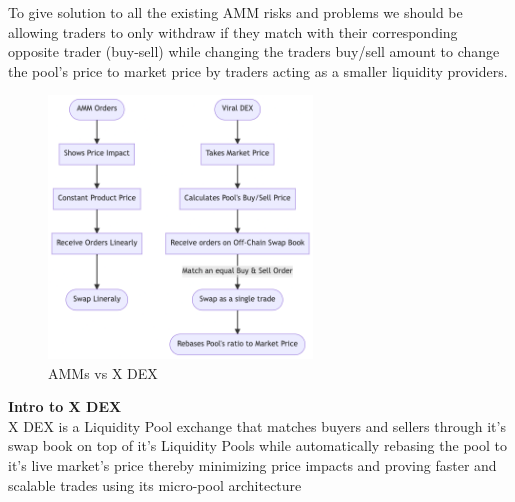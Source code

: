 \documentclass[letterpaper,11pt]{article}
\begin{document}
To give solution to all the existing AMM risks and problems we should be allowing traders to only withdraw if they match with their corresponding opposite trader (buy-sell) while changing the traders buy/sell amount to change the pool's price to market price by traders acting as a smaller liquidity providers. \\

\begin{figure}[H]
\begin{center}
\includegraphics[width=7cm]{dex}
\caption{AMMs vs X DEX}
\end{center}
\end{figure}

\textbf{Intro to X DEX}\\

X DEX is a Liquidity Pool exchange that matches buyers and sellers through it's swap book on top of it's Liquidity Pools while automatically rebasing the pool to it's live market's price thereby minimizing price impacts and proving faster and scalable trades using its micro-pool architecture\\
\end{document}
